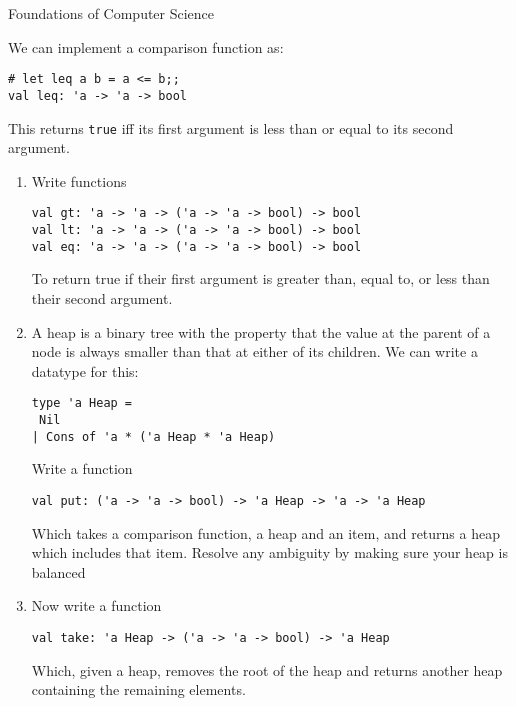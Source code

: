 \documentclass{tripos}  %
\begin{document}
\begin{question}[MockIA,year=2024,paper=1,question=4,author=rrw]{Foundations of Computer Science}


  We can implement a comparison function as:

\begin{verbatim}
# let leq a b = a <= b;;
val leq: 'a -> 'a -> bool
\end{verbatim}

This returns \verb|true| iff its first argument is less than or equal to its second argument.

\begin{enumerate}
\item Write functions

\begin{verbatim}
val gt: 'a -> 'a -> ('a -> 'a -> bool) -> bool
val lt: 'a -> 'a -> ('a -> 'a -> bool) -> bool
val eq: 'a -> 'a -> ('a -> 'a -> bool) -> bool
\end{verbatim}

To return true if their first argument is greater than, equal to, or less than their second argument.

\item A heap is a binary tree with the property that the value at the parent of a node is always smaller than that at either of its children.
  We can write a datatype for this:

\begin{verbatim}
type 'a Heap =
 Nil
| Cons of 'a * ('a Heap * 'a Heap)
\end{verbatim}

Write a function

\begin{verbatim}
val put: ('a -> 'a -> bool) -> 'a Heap -> 'a -> 'a Heap
\end{verbatim}

Which takes a comparison function, a heap and an item, and returns a heap which includes that item. Resolve any ambiguity by making sure your heap is balanced

\item Now write a function

\begin{verbatim}
val take: 'a Heap -> ('a -> 'a -> bool) -> 'a Heap
\end{verbatim}

Which, given a heap, removes the root of the heap and returns another heap containing the remaining elements.


\end{enumerate}
\end{question}
\end{document}
